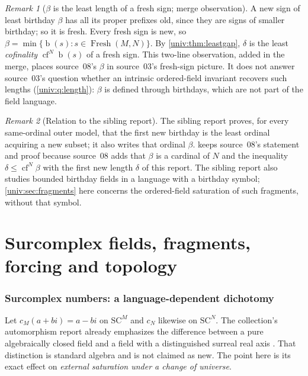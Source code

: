 \documentclass[11pt,letterpaper]{article}
\numberwithin{equation}{section}
\theoremstyle{definition}
\theoremstyle{remark}
\newtheorem{remark}[remark]{Remark}
\newcommand{\SC}{\mathrm{SC}}
\newcommand{\SCM}{\SC^{M}}
\newcommand{\SCN}{\SC^{N}}
\newcommand{\bd}{\operatorname{b}}
\newcommand{\cf}{\operatorname{cf}}
\newcommand{\Fresh}{\operatorname{Fresh}}
\begin{document}
\begin{remark}[$\beta$ is the least length of a fresh sign; merge observation]\label{univ:rem:betafresh}
A new sign of least birthday $\beta$ has all its proper prefixes old, since
they are signs of smaller birthday; so it is fresh. Every fresh sign is new, so
$\beta=\min\{\bd(s):s\in\Fresh(M,N)\}$. By \cref{univ:thm:leastgap}, $\delta$
is the least \emph{cofinality} $\cf^N\bd(s)$ of a fresh sign. This two-line
observation, added in the merge, places source~08's $\beta$ in source~03's
fresh-sign picture. It does not answer source~03's question whether an
intrinsic ordered-field invariant recovers such lengths
(\cref{univ:q:length}): $\beta$ is defined through birthdays, which are not
part of the field language.
\end{remark}

\begin{remark}[Relation to the sibling report]\label{univ:rem:sibling}
The sibling report
proves, for every same-ordinal outer model, that the first new birthday is the
least ordinal acquiring a new subset; it also writes that ordinal $\beta$.
 keeps source~08's statement and
proof because source~08 adds that $\beta$ is a cardinal of $N$ and the
inequality $\delta\le\cf^N\beta$ with the first new length $\delta$ of this
report. The sibling report also studies bounded birthday fields in a language
with a birthday symbol; \cref{univ:sec:fragments} here concerns the
ordered-field saturation of such fragments, without that symbol.
\end{remark}

\part{Surcomplex fields, fragments, forcing and topology}\label{univ:part:further}

\section{Surcomplex numbers: a language-dependent dichotomy}\label{univ:sec:complex}

Let $c_M(a+bi)=a-bi$ on $\SCM$ and $c_N$ likewise on $\SCN$. The collection's
automorphism report already emphasizes the difference between a pure
algebraically closed field and a field with a distinguished surreal real axis
\cite{RepoAutomorphisms}. That distinction is standard algebra and is not
claimed as new. The point here is its exact effect on \emph{external
saturation under a change of universe}.
\end{document}
